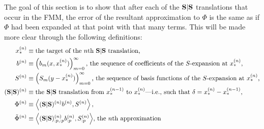 The goal of this section is to show that after each of the $\bold{S}|\bold{S}$
translations that occur in the FMM, the error of the resultant
approximation to $\Phi$ is the same as if $\Phi$ had been expanded at
that point with that many terms. This will be made more clear through
the following definitions:
\begin{align*}
  x_*^{(n)} &\equiv \mbox{the target of the $n$th $\bold{S}|\bold{S}$ translation,} \\
  b^{(n)} &\equiv \left(b_m(x, x_*^{(n)})\right)_{m=0}^\infty \text{, the sequence of coefficients of the $S$-expansion at $x_*^{(n)}$,} \\
  S^{(n)} &\equiv \left(S_m(y - x_*^{(n)})\right)_{m=0}^\infty \text{, the sequence of basis functions of the $S$-expansion at $x_*^{(n)}$,} \\
  (\bold{S}|\bold{S})^{(n)} &\equiv \text{the $\bold{S}|\bold{S}$ translation from $x_*^{(n-1)}$ to $x_*^{(n)}$\----i.e., such that $\delta = x_*^{(n)} - x_*^{(n-1)}$,} \\
  \Phi^{(n)} &\equiv \left\langle (\bold{S}|\bold{S})^{(n)} b^{(n)}, S^{(n)} \right\rangle, \\
  \tilde{\Phi}^{(n)} &\equiv \text{$\left\langle (\bold{S}|\bold{S})_{:p,:p}^{(n)} b_{:p}^{(n)}, S_{:p}^{(n)} \right\rangle$, the $n$th approximation}
\end{align*}

